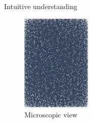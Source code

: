 \documentclass[aspectratio=169]{beamer}
\begin{document}
\begin{frame}{Intuitive understanding}
    \begin{figure}
        \centering
        \includegraphics[width=3.3cm]{../pic/diffusion_static.png}
        \caption{Microscopic view}
    \end{figure}
\end{frame}
\end{document}
